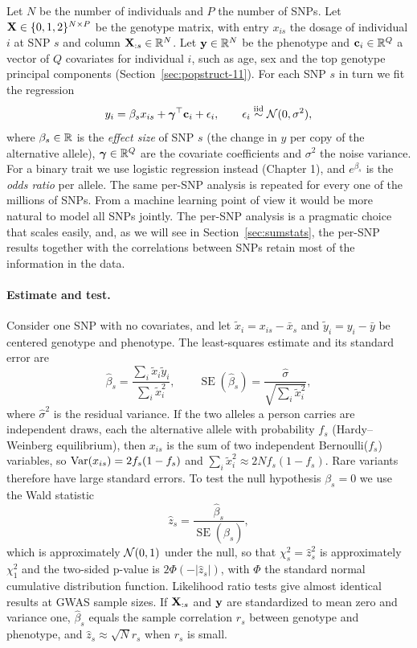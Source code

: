 Let $N$ be the number of individuals and $P$ the number of SNPs. Let $\mathbf{X}\in\{0,1,2\}^{N\times P}$ be the genotype matrix, with entry $x_{is}$ the dosage of individual $i$ at SNP $s$ and column $\mathbf{X}_{:s}\in\mathbb{R}^N$. Let $\mathbf{y}\in\mathbb{R}^N$ be the phenotype and $\mathbf{c}_i\in\mathbb{R}^Q$ a vector of $Q$ covariates for individual $i$, such as age, sex and the top genotype principal components (Section~\ref{sec:popstruct-11}). For each SNP $s$ in turn we fit the regression
\begin{equation}
  y_i = \beta_s x_{is} + \boldsymbol{\gamma}^\top\mathbf{c}_i + \epsilon_i, \qquad \epsilon_i\overset{\text{iid}}{\sim}\mathcal{N}(0,\sigma^2),
  \label{eq:gwas_snp}
\end{equation}
where $\beta_s\in\mathbb{R}$ is the \emph{effect size} of SNP $s$ (the change in $y$ per copy of the alternative allele), $\boldsymbol{\gamma}\in\mathbb{R}^Q$ are the covariate coefficients and $\sigma^2$ the noise variance. For a binary trait we use logistic regression instead (Chapter 1), and $e^{\beta_s}$ is the \emph{odds ratio} per allele. The same per-SNP analysis is repeated for every one of the millions of SNPs. From a machine learning point of view it would be more natural to model all SNPs jointly. The per-SNP analysis is a pragmatic choice that scales easily, and, as we will see in Section~\ref{sec:sumstats}, the per-SNP results together with the correlations between SNPs retain most of the information in the data.

\paragraph{Estimate and test.} Consider one SNP with no covariates, and let $\tilde x_i = x_{is}-\bar x_s$ and $\tilde y_i=y_i-\bar y$ be centered genotype and phenotype. The least-squares estimate and its standard error are
\begin{equation}
  \hat\beta_s = \frac{\sum_i\tilde x_i\tilde y_i}{\sum_i\tilde x_i^2}, \qquad
  \operatorname{SE}(\hat\beta_s) = \frac{\hat\sigma}{\sqrt{\sum_i\tilde x_i^2}},
\end{equation}
where $\hat\sigma^2$ is the residual variance. If the two alleles a person carries are independent draws, each the alternative allele with probability $f_s$ (Hardy--Weinberg equilibrium), then $x_{is}$ is the sum of two independent Bernoulli($f_s$) variables, so $\operatorname{Var}(x_{is})=2f_s(1-f_s)$ and $\sum_i\tilde x_i^2\approx 2Nf_s(1-f_s)$. Rare variants therefore have large standard errors. To test the null hypothesis $\beta_s=0$ we use the Wald statistic
\begin{equation}
  \hat z_s = \frac{\hat\beta_s}{\operatorname{SE}(\hat\beta_s)},
\end{equation}
which is approximately $\mathcal{N}(0,1)$ under the null, so that $\chi^2_s=\hat z_s^2$ is approximately $\chi^2_1$ and the two-sided p-value is $2\Phi(-|\hat z_s|)$, with $\Phi$ the standard normal cumulative distribution function. Likelihood ratio tests give almost identical results at GWAS sample sizes. If $\mathbf{X}_{:s}$ and $\mathbf{y}$ are standardized to mean zero and variance one, $\hat\beta_s$ equals the sample correlation $r_s$ between genotype and phenotype, and $\hat z_s\approx\sqrt N r_s$ when $r_s$ is small.

